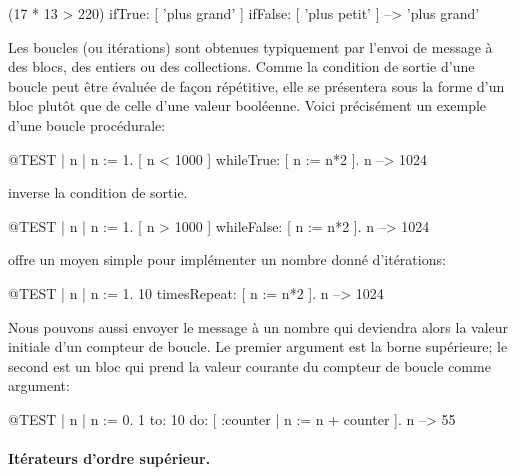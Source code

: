 \documentclass[a4paper,10pt,twoside]{book}
\begin{document}
\begin{code}{}
(17 * 13 > 220)
   ifTrue: [ 'plus grand' ]
   ifFalse: [ 'plus petit' ] --> 'plus grand'
\end{code}

Les boucles (ou it\'{e}rations) sont obtenues typiquement par l'envoi de message \`{a} des blocs, des entiers ou des collections.
Comme la condition de sortie d'une boucle peut \^{e}tre \'{e}valu\'{e}e de fa\c{c}on r\'{e}p\'{e}titive, elle se pr\'{e}sentera sous la forme d'un bloc plut\^{o}t que de celle d'une valeur bool\'{e}enne.
Voici pr\'{e}cis\'{e}ment un exemple d'une boucle proc\'{e}durale:

\begin{code}{@TEST | n |}
n := 1.
[ n < 1000 ] whileTrue: [ n := n*2 ].
n --> 1024
\end{code}

\noindent
{} inverse la condition de sortie.

\begin{code}{@TEST | n |}
n := 1.
[ n > 1000 ] whileFalse: [ n := n*2 ].
n --> 1024
\end{code}

\noindent
{} offre un moyen simple pour impl\'{e}menter un nombre donn\'{e} d'it\'{e}rations:
\begin{code}{@TEST | n |}
n := 1.
10 timesRepeat: [ n := n*2 ].
n --> 1024
\end{code}
Nous pouvons aussi envoyer le message  \`{a} un
nombre qui deviendra alors la valeur initiale d'un compteur de boucle.
Le premier argument est la borne sup\'{e}rieure; le second est un bloc qui prend la valeur courante du compteur de boucle comme argument:

\begin{code}{@TEST | n |}
n := 0.
1 to: 10 do: [ :counter | n := n + counter ].
n --> 55
\end{code}

\paragraph{It\'erateurs d'ordre sup\'erieur.}
\end{document}
